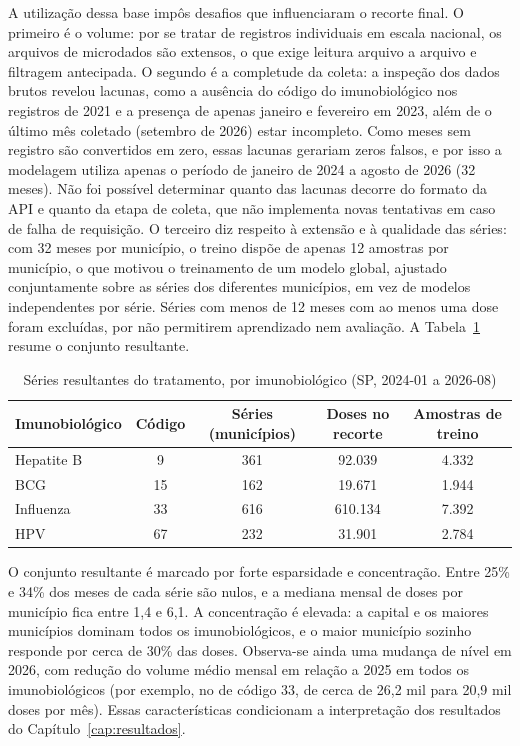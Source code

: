 \documentclass[
    12pt,
    openright,
    oneside,
    a4paper,
    english,
    brazil
]{abntex2}
\begin{document}
A utilização dessa base impôs desafios que influenciaram o recorte final. O primeiro é o volume: por se tratar de registros individuais em escala nacional, os arquivos de microdados são extensos, o que exige leitura arquivo a arquivo e filtragem antecipada. O segundo é a completude da coleta: a inspeção dos dados brutos revelou lacunas, como a ausência do código do imunobiológico nos registros de 2021 e a presença de apenas janeiro e fevereiro em 2023, além de o último mês coletado (setembro de 2026) estar incompleto. Como meses sem registro são convertidos em zero, essas lacunas gerariam zeros falsos, e por isso a modelagem utiliza apenas o período de janeiro de 2024 a agosto de 2026 (32 meses). Não foi possível determinar quanto das lacunas decorre do formato da API e quanto da etapa de coleta, que não implementa novas tentativas em caso de falha de requisição. O terceiro diz respeito à extensão e à qualidade das séries: com 32 meses por município, o treino dispõe de apenas 12 amostras por município, o que motivou o treinamento de um modelo global, ajustado conjuntamente sobre as séries dos diferentes municípios, em vez de modelos independentes por série. Séries com menos de 12 meses com ao menos uma dose foram excluídas, por não permitirem aprendizado nem avaliação. A Tabela~\ref{tab:series} resume o conjunto resultante.

\begin{table}[htb]
    \centering
    \caption{Séries resultantes do tratamento, por imunobiológico (SP, 2024-01 a 2026-08)}
    \label{tab:series}
    \begin{tabular}{lcccc}
        \toprule
        \textbf{Imunobiológico} & \textbf{Código} & \textbf{Séries (municípios)} & \textbf{Doses no recorte} & \textbf{Amostras de treino} \\
        \midrule
        Hepatite B & 9 & 361 & 92.039 & 4.332 \\
        BCG & 15 & 162 & 19.671 & 1.944 \\
        Influenza & 33 & 616 & 610.134 & 7.392 \\
        HPV & 67 & 232 & 31.901 & 2.784 \\
        \bottomrule
    \end{tabular}
\end{table}

O conjunto resultante é marcado por forte esparsidade e concentração. Entre 25\% e 34\% dos meses de cada série são nulos, e a mediana mensal de doses por município fica entre 1,4 e 6,1. A concentração é elevada: a capital e os maiores municípios dominam todos os imunobiológicos, e o maior município sozinho responde por cerca de 30\% das doses. Observa-se ainda uma mudança de nível em 2026, com redução do volume médio mensal em relação a 2025 em todos os imunobiológicos (por exemplo, no de código 33, de cerca de 26,2 mil para 20,9 mil doses por mês). Essas características condicionam a interpretação dos resultados do Capítulo~\ref{cap:resultados}.
\end{document}
